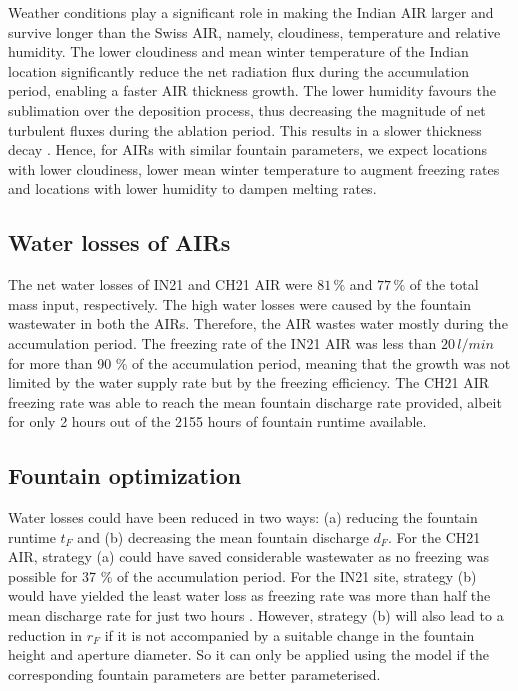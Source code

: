 \documentclass[utf8]{frontiersSCNS}
\begin{document}
Weather conditions play a significant role in making the Indian AIR larger and survive longer than the
Swiss AIR, namely, cloudiness, temperature and relative humidity. The lower cloudiness and mean winter
temperature of the Indian location significantly reduce the net radiation flux during the accumulation period, enabling a faster AIR thickness growth.  The lower humidity favours the sublimation over the deposition
process, thus decreasing the magnitude of net turbulent fluxes during the ablation period. This
results in a slower thickness decay .  Hence, for AIRs with similar fountain parameters, we expect locations
with lower cloudiness, lower mean winter temperature to augment freezing rates and locations with lower humidity
to dampen melting rates.

\subsection{Water losses of AIRs}

The net water losses of IN21 and CH21 AIR were $81\,\%$ and $77\,\%$ of the total mass input, respectively. The
high water losses were caused by the fountain wastewater in both the AIRs. Therefore, the AIR wastes water
mostly during the accumulation period. The freezing rate of the IN21 AIR was less than $20\, l/min$ for more than
90 \% of the accumulation period, meaning that the growth was not limited by the water supply rate but by the
freezing efficiency. The CH21 AIR freezing rate was able to reach the mean fountain discharge rate provided,
albeit for only 2 hours out of the 2155 hours of fountain runtime available. 

\subsection{Fountain optimization}

Water losses could have been reduced in two ways: (a) reducing the fountain runtime $t_F$ and (b) decreasing the
mean fountain discharge $d_F$. For the CH21 AIR, strategy (a) could have saved considerable wastewater as no
freezing was possible for 37 \% of the accumulation period. For the IN21 site, strategy (b) would have yielded
the least water loss as freezing rate was more than half the mean discharge rate for just two hours . However,
strategy (b) will also lead to a reduction in $r_F$ if it is not accompanied by a suitable change in the
fountain height and aperture diameter. So it can only be applied using the model if the corresponding fountain
parameters are better parameterised.
\end{document}
